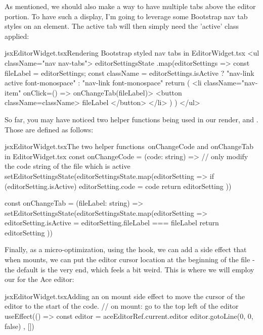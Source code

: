 \documentclass[paper=6in:9in,pagesize=pdftex,headinclude=on,footinclude=on,12pt]{scrbook}
\begin{document}
As mentioned, we should also make a way to have multiple tabs above the editor portion. To have such a display, I'm going to leverage some Bootstrap nav tab styles on an  element. The active tab will then simply need the 'active' class applied:

\begin{codeInput}{jsx}{EditorWidget.tsx}{Rendering Bootstrap styled nav tabs in EditorWidget.tsx}
  <ul className="nav nav-tabs">
  {editorSettingsState
    .map(editorSettings => {
      const { fileLabel } = editorSettings;
      const className =
      editorSettings.isActive
          ? "nav-link active font-monospace"
          : "nav-link font-monospace"
      return (
        <li className="nav-item" onClick={() => onChangeTab(fileLabel)}>
          <button className={className}>
            {fileLabel}
          </button>
        </li>
      )
    })}
</ul>
\end{codeInput}

So far, you may have noticed two helper functions being used in our render,  and . Those are defined as follows:

\begin{codeInput}{jsx}{EditorWidget.tsx}{The two helper functions\, onChangeCode and onChangeTab in EditorWidget.tsx}
const onChangeCode = (code: string) => {
  // only modify the code string of the file which is active
  setEditorSettingsState(editorSettingsState.map(editorSetting => {
    if (editorSetting.isActive) {
      editorSetting.code = code
    }
    return editorSetting
  }))
}

const onChangeTab = (fileLabel: string) => {
  setEditorSettingsState(editorSettingsState.map(editorSetting => {
      editorSetting.isActive = editorSetting.fileLabel === fileLabel
    return editorSetting
  }))
}
\end{codeInput}

Finally, as a micro-optimization, using the  hook, we can add a side effect that when  mounts, we can put the editor cursor location at the beginning of the file - the default is the very end, which feels a bit weird. This is where we will employ our  for the Ace editor:

\begin{codeInput}{jsx}{EditorWidget.tsx}{Adding an on mount side effect to move the cursor of the editor to the start of the code.}
// on mount: go to the top left of the editor
useEffect(() => {
  const editor = aceEditorRef.current.editor
  editor.gotoLine(0, 0, false)
}, [])
\end{codeInput}
\end{document}
